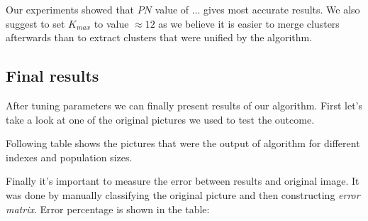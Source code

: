 \documentclass[11pt,leqno]{article}
\theoremstyle{mytheoremstyle}
\theoremstyle{mytheoremstyle}
\begin{document}
\begin{center}
\begin{figure}

\end{figure}
\end{center}

Our experiments showed that $PN$ value of ... gives most accurate results. We also suggest to set $K_{max}$ to value $\approx 12$ as we believe it is easier to merge clusters afterwards than to extract clusters that were unified by the algorithm.

\subsection{Final results}

After tuning parameters we can finally present results of our algorithm. First let's take a look at one of the original pictures we used to test the outcome.

\begin{center}
\begin{figure}

\end{figure}
\end{center}

Following table shows the pictures that were the output of algorithm for different indexes and population sizes.

\begin{center}
\begin{figure}

\end{figure}
\end{center}


Finally it's important to measure the error between results and original image. It was done by manually classifying the original picture and then constructing \textit{error matrix}. Error percentage is shown in the table:

\begin{table}
\begin{tabular}{l|c|c|c|}

\end{tabular}
\end{table}
\end{document}
